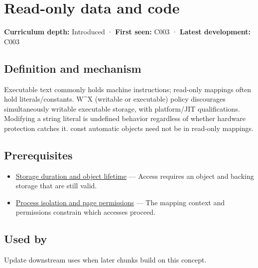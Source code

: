 \hypertarget{appendix-5f9e5e2f0a5e}{}\label{referencestart:appendix-5f9e5e2f0a5e}
\section{Read-only data and code}\label{appendix-5f9e5e2f0a5e-read-only-data-and-code}

\textbf{Curriculum depth:} Introduced · \textbf{First seen:} C003 · \textbf{Latest development:} C003

\begin{allmightroledefinition}

\subsection{Definition and mechanism}\label{appendix-5f9e5e2f0a5e-definition-and-mechanism}

Executable text commonly holds machine instructions; read-only mappings often hold literals/constants. W\^{}X (writable or executable) policy discourages simultaneously writable executable storage, with platform/JIT qualifications. Modifying a string literal is undefined behavior regardless of whether hardware protection catches it. const automatic objects need not be in read-only mappings.

\end{allmightroledefinition}

\subsection{Prerequisites}\label{appendix-5f9e5e2f0a5e-prerequisites}

\begin{itemize}
\tightlist
\item
  \hyperref[appendix-0b104bcba06b]{Storage duration and object lifetime} --- Access requires an object and backing storage that are still valid.
\item
  \hyperref[appendix-c2a9ad1e2b49]{Process isolation and page permissions} --- The mapping context and permissions constrain which accesses proceed.
\end{itemize}

\subsection{Used by}\label{appendix-5f9e5e2f0a5e-used-by}

Update downstream uses when later chunks build on this concept.

